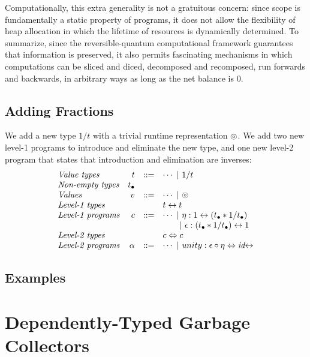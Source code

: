 \documentclass[sigplan,10pt,review,anonymous]{acmart}
\newcommand{\alt}{~|~}
\newcommand{\oneover}[1]{1/#1}
\newcommand{\idc}{\mathit{id}\!\!\leftrightarrow}
\begin{document}
Computationally, this extra generality is not a gratuitous concern:
since scope is fundamentally a static property of programs, it does
not allow the flexibility of heap allocation in which the lifetime of
resources is dynamically determined. To summarize, since the
reversible-quantum computational framework guarantees that information
is preserved, it also permits fascinating mechanisms in which
computations can be sliced and diced, decomposed and recomposed, run
forwards and backwards, in arbitrary ways as long as the net balance
is 0.

\subsection{Adding Fractions}
 
\newcommand{\net}{t_\bullet}

We add a new type $\oneover{t}$ with a trivial runtime representation
$\ocircle$. We add two new level-1 programs to introduce and eliminate
the new type, and one new level-2 program that states that
introduction and elimination are inverses:
\[\begin{array}{lrcl}
\textit{Value types} & t &::=& \cdots \alt \oneover{t} \\
\textit{Non-empty types} & \net \\
\textit{Values}      & v &::=& \cdots \alt \ocircle \\
\textit{Level-1 types} &&& t \leftrightarrow t \\
\textit{Level-1 programs} & c &::=& \cdots \alt
   \eta : 1 \leftrightarrow (\net * \oneover{\net}) \\
   &&& ~~~~~\alt \epsilon : (\net * \oneover{\net}) \leftrightarrow 1 \\
\textit{Level-2 types} &&& c \Leftrightarrow c \\
\textit{Level-2 programs} & \alpha &::=& \cdots 
  \alt unity : \epsilon \circ \eta \Leftrightarrow \idc 
\end{array}\]



\EtaEpsilonEval{}

\subsection{Examples}

\EtaEpsilonExamples{}

\section{Dependently-Typed Garbage Collectors}
\end{document}
